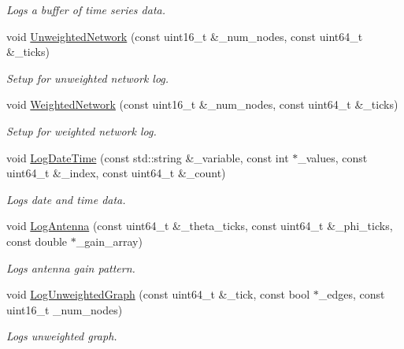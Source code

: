 \begin{DoxyCompactItemize}
\begin{DoxyCompactList}\small\item\em Logs a buffer of time series data. \end{DoxyCompactList}\item 
void \hyperlink{classosse_1_1collaborate_1_1_data_logger_a5c69d3fc5aa12053eebc1b5406f8bf6a}{Unweighted\+Network} (const uint16\+\_\+t \&\+\_\+num\+\_\+nodes, const uint64\+\_\+t \&\+\_\+ticks)
\begin{DoxyCompactList}\small\item\em Setup for unweighted network log. \end{DoxyCompactList}\item 
void \hyperlink{classosse_1_1collaborate_1_1_data_logger_ac056c731698a952e787e79a6cbb6129f}{Weighted\+Network} (const uint16\+\_\+t \&\+\_\+num\+\_\+nodes, const uint64\+\_\+t \&\+\_\+ticks)
\begin{DoxyCompactList}\small\item\em Setup for weighted network log. \end{DoxyCompactList}\item 
void \hyperlink{classosse_1_1collaborate_1_1_data_logger_ad185f66e5e4bc3b3097c784604afbe80}{Log\+Date\+Time} (const std\+::string \&\+\_\+variable, const int $\ast$\+\_\+values, const uint64\+\_\+t \&\+\_\+index, const uint64\+\_\+t \&\+\_\+count)
\begin{DoxyCompactList}\small\item\em Logs date and time data. \end{DoxyCompactList}\item 
void \hyperlink{classosse_1_1collaborate_1_1_data_logger_aef191bf287c09ccf4047addcf481c95b}{Log\+Antenna} (const uint64\+\_\+t \&\+\_\+theta\+\_\+ticks, const uint64\+\_\+t \&\+\_\+phi\+\_\+ticks, const double $\ast$\+\_\+gain\+\_\+array)
\begin{DoxyCompactList}\small\item\em Logs antenna gain pattern. \end{DoxyCompactList}\item 
void \hyperlink{classosse_1_1collaborate_1_1_data_logger_a024bca9bbbf41aeb8842308bc4feb3f2}{Log\+Unweighted\+Graph} (const uint64\+\_\+t \&\+\_\+tick, const bool $\ast$\+\_\+edges, const uint16\+\_\+t \+\_\+num\+\_\+nodes)
\begin{DoxyCompactList}\small\item\em Logs unweighted graph. \end{DoxyCompactList}\item 

\end{DoxyCompactItemize}
